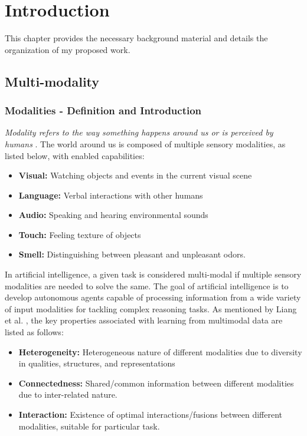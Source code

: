 \chapter{Introduction}
\label{cha:introduction}
This chapter provides the necessary background material and details the organization of my proposed work.

\section{Multi-modality}
\subsection{Modalities - Definition and Introduction}
\textit{Modality refers to the way something happens around us or is perceived by humans} \cite{Baltruaitis2017MultimodalML}. The world around us is composed of multiple sensory modalities, as listed below, with enabled capabilities:
\begin{itemize}
    \item \textbf{Visual:} Watching objects and events in the current visual scene
    \item \textbf{Language:} Verbal interactions with other humans 
    \item \textbf{Audio:} Speaking and hearing environmental sounds 
    \item \textbf{Touch:} Feeling texture of objects 
    \item \textbf{Smell:} Distinguishing between pleasant and unpleasant odors.
\end{itemize}
In artificial intelligence, a given task is considered multi-modal if multiple sensory modalities are needed to solve the same. The goal of artificial intelligence is to develop autonomous agents capable of processing information from a wide variety of input modalities for tackling complex reasoning tasks. As mentioned by Liang et al. \cite{Liang2022FoundationsAR}, the key properties associated with learning from multimodal data are listed as follows:
\begin{itemize}
    \item \textbf{Heterogeneity:} Heterogeneous nature of different modalities due to diversity in qualities, structures, and representations
    \item \textbf{Connectedness:} Shared/common information between different modalities due to inter-related nature.
    \item \textbf{Interaction:} Existence of optimal interactions/fusions between different modalities, suitable for particular task.
\end{itemize}
    

